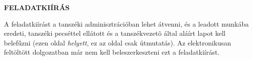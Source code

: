 \clearpage
\begin{center}
\large
\textbf{FELADATKIÍRÁS}\\
\end{center}

A feladatkiírást a tanszéki adminisztrációban lehet átvenni, és a leadott munkába eredeti, tanszéki
pecséttel ellátott és a tanszékvezetõ által aláírt lapot kell belefűzni (ezen oldal \emph{helyett},
ez az oldal csak útmutatás). Az elektronikusan feltöltött dolgozatban már nem kell beleszerkeszteni
ezt a feladatkiírást.

